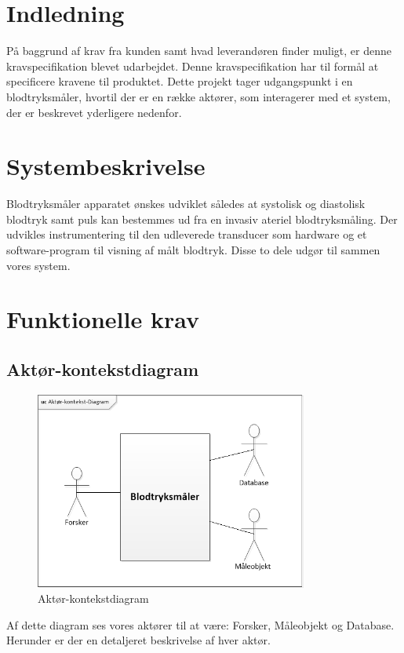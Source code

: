 \section{Indledning}
På baggrund af krav fra kunden samt hvad leverandøren finder muligt, er denne kravspecifikation blevet udarbejdet. Denne kravspecifikation har til formål at specificere kravene til produktet. Dette projekt tager udgangspunkt i en blodtryksmåler, hvortil der er en række aktører, som interagerer med et system, der er beskrevet yderligere nedenfor.

\section{Systembeskrivelse}
Blodtryksmåler apparatet ønskes udviklet således at systolisk og diastolisk blodtryk samt puls kan bestemmes ud fra en invasiv ateriel blodtryksmåling. Der udvikles instrumentering til den udleverede transducer som hardware og et software-program til visning af målt blodtryk. Disse to dele udgør til sammen vores system. 

\section{Funktionelle krav}
 

\subsection{Aktør-kontekstdiagram}


\begin{figure}[htb]
	\centering
	\includegraphics[width=0.8\textwidth]{Figurer/Aktor-kontekst-diagram}
	\caption{Aktør-kontekstdiagram}
	\label{fig:aktoerbeskrivelse}
\end{figure}
Af dette diagram ses vores aktører til at være: Forsker, Måleobjekt og Database. Herunder er der en detaljeret beskrivelse af hver aktør.


